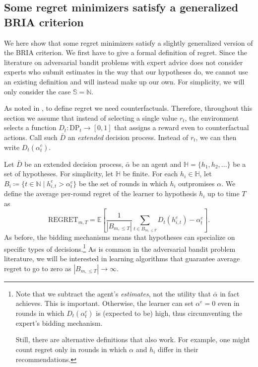 \documentclass[submission,copyright,creativecommons]{eptcs}
\newcommand{\DP}{\mathrm{DP}}
\begin{document}
\begin{extendedonlyblock}
\section{Some regret minimizers satisfy a generalized BRIA criterion}
\label{appendix:regret-minimizers-satisfy-BRIA}

We here show that some regret minimizers satisfy a slightly generalized version of the BRIA criterion. We first have to give a formal definition of regret. Since the literature on adversarial bandit problems with expert advice does not consider experts who submit estimates in the way that our hypotheses do, we cannot use an existing definition and will instead make up our own. For simplicity, we will only consider the case $\mathbb{S}=\mathbb{N}$.

As noted in , to define regret we need counterfactuals. Therefore, throughout this section we assume that instead of selecting a single value $r_t$, the environment selects a function $D_t\colon \DP_t \rightarrow [0,1]$ that assigns a reward even to counterfactual actions. Call such $\bar D$ an \textit{extended} decision process. Instead of $r_t$, we can then write $D_t(\alpha_t^c)$.

Let $\bar D$ be an extended decision process, $\bar\alpha$ be an agent and $\mathbb{H}=\{h_1,h_2,...\}$ be a set of hypotheses. For simplicity, let $\mathbb{H}$ be finite. For each $h_i\in \mathbb{H}$, let $B_i\coloneqq \{ t\in \mathbb{N}\mid h_{i,t}^e>\alpha_t^e  \}$ be the set of rounds in which $h_i$ outpromises $\alpha$. We define the average per-round regret of the learner to hypothesis $h_i$ up to time $T$ as
\begin{equation*}
\mathrm{REGRET}_{m,T}=\mathbb{E}\left[\frac{1}{|B_{m,\leq T}|} \sum_{t\in B_{m,\leq T}} D_t(h_{i,t}^c) - \alpha_t^e \right].
\end{equation*}
As before, the bidding mechanisms means that hypotheses can specialize on specific types of decisions.\footnote{Note that we subtract the agent's \textit{estimates}, not the utility that $\bar \alpha$ in fact achieves. This is important. Otherwise, the learner can set $\alpha^e=0$ even in rounds in which $D_t(\alpha_t^c)$ is (expected to be) high, thus circumventing the expert's bidding mechanism.

Still, there are alternative definitions that also work. For example, one might count regret only in rounds in which $\alpha$ and $h_i$ differ in their recommendations.}
As is common in the adversarial bandit problem literature, we will be interested in learning algorithms that guarantee average regret to go to zero as $|B_{m,\leq T}| \rightarrow \infty$.


\end{extendedonlyblock}
\end{document}
